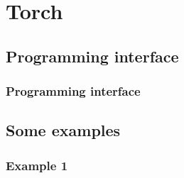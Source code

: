 
\section{Torch}\label{sec:Torch}

\subsection{Programming interface}

\begin{frame}
  \MyLogo
  \frametitle{Programming interface}  

\end{frame}

\subsection{Some examples}

\begin{frame}
  \MyLogo
  \frametitle{Example 1}  

\end{frame}